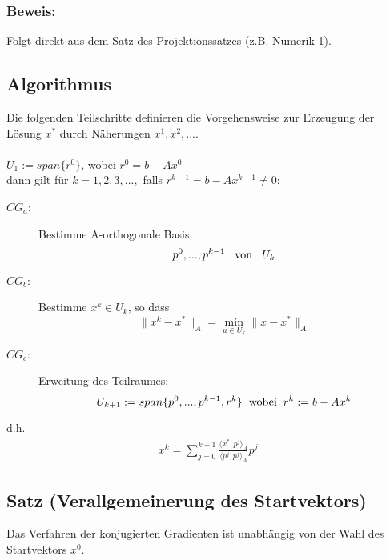 \documentclass{article}
\begin{document}
\subsubsection{Beweis:}
Folgt direkt aus dem Satz des Projektionssatzes (z.B. Numerik 1).

\subsection{Algorithmus}
Die folgenden Teilschritte definieren die Vorgehensweise zur Erzeugung der Lösung $x^{*}$ durch Näherungen $x^{1}, x^{2},...$.
\\\\$U_{1} := span\{r^{0}\}$, wobei $r^{0} = b - Ax^{0}$
\\dann gilt für $k = 1,2,3,...,$ falls $r^{k-1} = b - Ax^{k-1} \ne 0$:
\begin{description}
\item[$CG_{a}$:] Bestimme A-orthogonale Basis
\begin{equation}
p^{0},...,p^{k-1} \hspace{3mm} \textnormal{von} \hspace{3mm} U_{k}
\end{equation}
\item[$CG_{b}$:] Bestimme $x^{k} \in U_{k}$, so dass
\begin{equation}
\|x^{k} - x^{*}\|_{A} = \underset{u \in U_{k}}{\min} \|x - x^{*}\|_{A}
\end{equation}
\item[$CG_{c}$:] Erweitung des Teilraumes:
\begin{equation}
U_{k+1} := span\{p^{0},...,p^{k-1},r^{k}\} \hspace{2mm} \textnormal{wobei} \hspace{2mm} r^{k} := b - Ax^{k}
\end{equation}
\end{description}
d.h.
\begin{align}
x^{k} = \sum_{j=0}^{k-1} \frac {\langle x^{*}, p^{j} \rangle _{A}} {\langle p^{j}, p^{j} \rangle _{A}} p^{j}
\end{align}

\subsection{Satz (Verallgemeinerung des Startvektors)}
Das Verfahren der konjugierten Gradienten ist unabhängig von der Wahl des Startvektors $x^{0}$.
\end{document}
